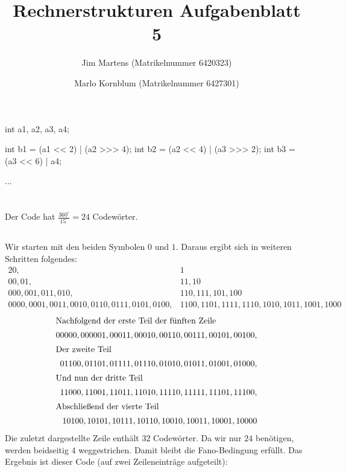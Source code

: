 \documentclass[10pt,a4paper,oneside,ngerman,numbers=noenddot]{scrartcl}
\begin{document}
\author{Jim Martens (Matrikelnummer 6420323) \and Marlo Kornblum (Matrikelnummer 6427301)}
\title{Rechnerstrukturen Aufgabenblatt 5}
\maketitle

\section{}%
\begin{java}
int a1, a2, a3, a4;

int b1 = (a1 << 2) | (a2 >>> 4);
int b2 = (a2 << 4) | (a3 >>> 2);
int b3 = (a3 << 6) | a4;

...
\end{java}
\section{}%
\subsection{} %
Der Code hat $\frac{360^{\circ}}{15^{\circ}}=24$ Codewörter.
\subsection{} %
Wir starten mit den beiden Symbolen $0$ und $1$. Daraus ergibt sich in weiteren Schritten folgendes:
\begin{alignat*}{2}
0, & 1 \\
00, 01, & 11, 10 \\
000, 001, 011, 010, & 110, 111, 101, 100 \\
0000, 0001, 0011, 0010, 0110, 0111, 0101, 0100, & 1100, 1101, 1111, 1110, 1010, 1011, 1001, 1000
\end{alignat*}
\begin{alignat*}{2}
\intertext{Nachfolgend der erste Teil der fünften Zeile}
00000, 000001, 00011, 00010, 00110, 00111, 00101, 00100,\\
\intertext{Der zweite Teil}
01100, 01101, 01111, 01110, 01010, 01011, 01001, 01000,\\
\intertext{Und nun der dritte Teil} 11000, 11001, 11011, 11010, 11110, 11111, 11101, 11100,\\
\intertext{Abschließend der vierte Teil}
10100, 10101, 10111, 10110, 10010, 10011, 10001, 10000
\end{alignat*}
Die zuletzt dargestellte Zeile enthält $32$ Codewörter. Da wir nur $24$ benötigen, werden beidseitig $4$ weggestrichen. Damit bleibt die Fano-Bedingung erfüllt. Das Ergebnis ist dieser Code (auf zwei Zeileneinträge aufgeteilt):
\end{document}
